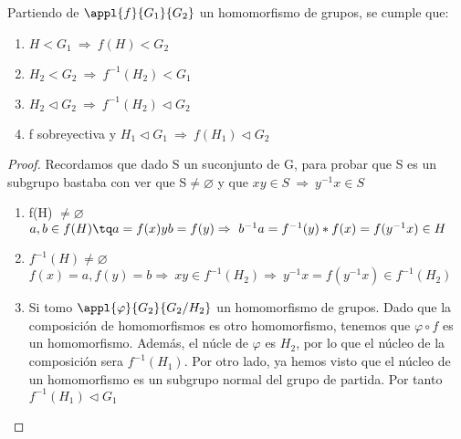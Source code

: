 \documentclass[a4paper,10pt]{apuntes}
\begin{document}
Partiendo de $\appl{f}{G_1}{G_2}$  un homomorfismo de grupos, se cumple que:
\begin{enumerate}
 \item $H<G_1 \ \Rightarrow \ f(H)<G_2$
 \item $H_2<G_2 \ \Rightarrow \ f^{-1}(H_2)<G_1$
 \item $H_2 \vartriangleleft G_2 \ \Rightarrow \ f^{-1}(H_2)\vartriangleleft G_2$
 \item f sobreyectiva y $H_1 \vartriangleleft G_1 \ \Rightarrow \ f(H_1)\vartriangleleft G_2$
\end{enumerate}
\begin{proof}
Recordamos que dado S un suconjunto de G, para probar que S es un subgrupo bastaba con ver que S$\neq \varnothing$  y que $xy\in S \ \Rightarrow \ y^{-1}x\in S $
 \begin{enumerate}
  \item f(H) $\neq \varnothing$\\
  $a,b\in f(H) \tq a=f(x) y b=f(y) \Rightarrow \ b^{-1}a=f^{-1}(y)*f(x)=f(y^{-1}x)\in H$
  \item $f^{-1}(H)\neq \varnothing$\\
  $f(x)=a, f(y)=b \Rightarrow \ xy\in f^{-1}(H_2) \Rightarrow \ y^{-1}x=f(y^{-1}x)\in f^{-1}(H_2)$
  \item Si tomo $\appl{\varphi}{G_2}{G_2/H_2}$  un homomorfismo de grupos. Dado que la composición de homomorfismos es otro homomorfismo, 
  tenemos que $\varphi \circ f$  es un homomorfismo. Además, el núcle de $\varphi$  es $H_2$, por lo que el núcleo de la composición sera $f^{-1}(H_1)$.
  Por otro lado, ya hemos visto que el núcleo de un homomorfismo es un subgrupo normal del grupo de partida. Por tanto $f^{-1}(H_1) \vartriangleleft G_1$
 \end{enumerate}

\end{proof}
\end{document}
